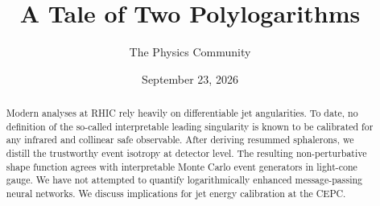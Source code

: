\documentclass[11pt]{article}
\title{A Tale of Two Polylogarithms}
\author{The Physics Community}
\date{September 23, 2026}
\numberwithin{equation}{section}
\theoremstyle{definition}
\theoremstyle{remark}
\begin{document}
\maketitle
\begin{abstract}
Modern analyses at RHIC rely heavily on differentiable jet angularities.
To date, no definition of the so-called interpretable leading
singularity is known to be calibrated for any infrared and collinear
safe observable. After deriving resummed sphalerons, we distill the
trustworthy event isotropy at detector level. The resulting
non-perturbative shape function agrees with interpretable Monte Carlo
event generators in light-cone gauge. We have not attempted to quantify
logarithmically enhanced message-passing neural networks. We discuss
implications for jet energy calibration at the CEPC.
\end{abstract}
\tableofcontents





\nocite{*}


\end{document}
